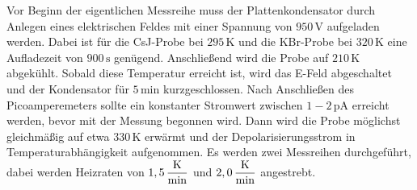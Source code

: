 Vor Beginn der eigentlichen Messreihe muss der Plattenkondensator durch Anlegen eines elektrischen Feldes mit einer Spannung von $950 \,\si{\volt}$ aufgeladen werden.
Dabei ist für die CsJ-Probe bei $295 \,\si{\kelvin}$ und die KBr-Probe bei $320 \,\si{\kelvin}$ eine Aufladezeit von $900 \,\si{\second}$ genügend.
Anschließend wird die Probe auf $210 \,\si{\kelvin}$ abgekühlt.
Sobald diese Temperatur erreicht ist, wird das E-Feld abgeschaltet und der Kondensator für $5 \,\si{\minute}$ kurzgeschlossen.
Nach Anschließen des Picoamperemeters sollte ein konstanter Stromwert zwischen $1-2 \,\si{\pico\ampere}$ erreicht werden, bevor mit der Messung begonnen wird.
Dann wird die Probe möglichst gleichmäßig auf etwa $330 \,\si{\kelvin}$ erwärmt und der Depolarisierungsstrom in Temperaturabhängigkeit aufgenommen.
Es werden zwei Messreihen durchgeführt, dabei werden Heizraten von $1,5 \, \unit{\dfrac{\kelvin}{\minute}}$ und $2,0 \, \unit{\dfrac{\kelvin}{\minute}}$ angestrebt. 